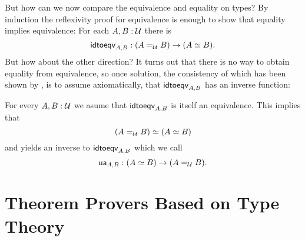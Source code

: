But how can we now compare the equivalence and equality on types?
By induction the reflexivity proof for equivalence is enough to show that
equality implies equivalence:
For each $A, B : \mathcal{U}$ there is
\begin{equation*}
\mathsf{idtoeqv}_{A, B} : (A =_{\mathcal{U}} B) \to (A \simeq B) \text{.}
\end{equation*}
But how about the other direction?
It turns out that there is no way to obtain equality from equivalence,
so once solution,
the consistency of which has been shown by \cite{kapulkinlumsdaine},
is to assume axiomatically, that $\mathsf{idtoeqv}_{A, B}$ has an inverse function:
\begin{axiom}[Univalence]
For every $A, B: \mathcal{U}$ we asume that
$\mathsf{idtoeqv}_{A, B}$ is itself an equivalence.
This implies that
\begin{equation*}
(A =_{\mathcal{U}} B) \simeq (A \simeq B)
\end{equation*}
and yields an inverse to $\mathsf{idtoeqv}_{A, B}$ which we call
\begin{equation*}
\mathsf{ua}_{A, B} : (A \simeq B) \to (A =_{\mathcal{U}} B) \text{.}
\end{equation*}
\end{axiom}


\section{Theorem Provers Based on Type Theory}\label{sec:tt-provers}











